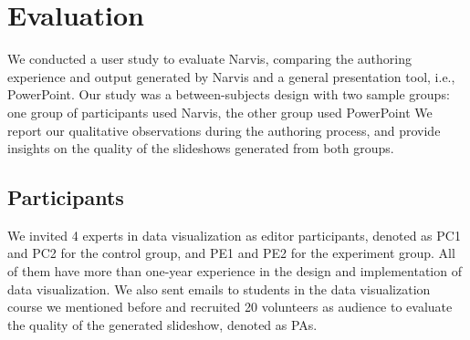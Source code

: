 \section{Evaluation}

We conducted a user study to evaluate Narvis, 
comparing the authoring experience and output generated by Narvis and a general presentation tool, i.e., PowerPoint.
Our study was a between-subjects design with two sample groups: one group of participants used Narvis, the other group used PowerPoint
We report our qualitative observations during the authoring process, and provide insights on the quality of the slideshows generated from both groups.

\subsection{Participants}
We invited 4 experts in data visualization as editor participants, denoted as PC1 and PC2 for the control group, and PE1 and PE2 for the experiment group. All of them have more than one-year experience in the design and implementation of data visualization. We also sent emails to students in the data visualization course we mentioned before and recruited 20 volunteers as audience to evaluate the quality of the generated slideshow, denoted as PAs. 
